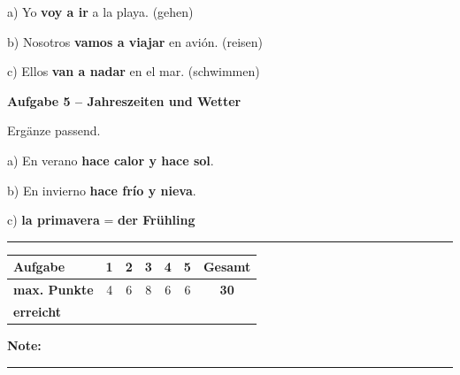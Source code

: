 \documentclass[11pt, a4paper]{article}
\newcommand{\fachfarbe}{spanisch}
\newcommand{\punktebox}[1]{\hfill\fbox{\small \_/#1}}
\newcommand{\luecke}[1]{\rule{#1}{0.4pt}}
\newcommand{\lsg}[1]{\textcolor{loesung}{\textbf{#1}}}
\newenvironment{aufgabe}[1]{%
    \needspace{5\baselineskip}%
    \nopagebreak[4]%
    \vspace{10pt}
    \noindent\textbf{\textcolor{\fachfarbe}{Aufgabe #1}}
    \nopagebreak[4]%
    \vspace{5pt}
    \nopagebreak[4]%
    \begin{list}{}{\leftmargin=0pt}
    \item[]
}{%
    \end{list}
}
\newcommand{\es}[1]{\textcolor{\fachfarbe}{\textbf{#1}}}
\begin{document}
\noindent
a) Yo \lsg{voy a ir} a la playa. \hfill (gehen)

\vspace{0.8em}

\noindent
b) Nosotros \lsg{vamos a viajar} en avión. \hfill (reisen)

\vspace{0.8em}

\noindent
c) Ellos \lsg{van a nadar} en el mar. \hfill (schwimmen)

\vspace{15pt}


\begin{aufgabe}{5 -- Jahreszeiten und Wetter}
Ergänze passend. \punktebox{6}
\end{aufgabe}

\noindent
a) En verano \lsg{hace calor y hace sol}.

\vspace{0.8em}

\noindent
b) En invierno \lsg{hace frío y nieva}.

\vspace{0.8em}

\noindent
c) \es{la primavera} = \lsg{der Frühling}


\vspace{25pt}
\hrule
\vspace{10pt}

\noindent
\begin{tabularx}{\textwidth}{|X|c|c|c|c|c||c|}
\hline
\textbf{Aufgabe} & 1 & 2 & 3 & 4 & 5 & \textbf{Gesamt} \\
\hline
\textbf{max. Punkte} & 4 & 6 & 8 & 6 & 6 & \textbf{30} \\
\hline
\textbf{erreicht} & & & & & & \\[0.8em]
\hline
\end{tabularx}

\vspace{10pt}

\begin{flushright}
\textbf{Note:} \luecke{2cm}
\end{flushright}
\end{document}
